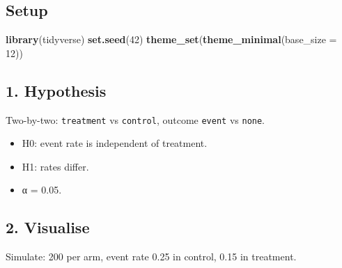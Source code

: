 \documentclass[
]{article}
\newenvironment{Shaded}{\begin{snugshade}}{\end{snugshade}}
\newcommand{\AttributeTok}[1]{\textcolor[rgb]{0.13,0.29,0.53}{#1}}
\newcommand{\DecValTok}[1]{\textcolor[rgb]{0.00,0.00,0.81}{#1}}
\newcommand{\FloatTok}[1]{\textcolor[rgb]{0.00,0.00,0.81}{#1}}
\newcommand{\FunctionTok}[1]{\textcolor[rgb]{0.13,0.29,0.53}{\textbf{#1}}}
\newcommand{\NormalTok}[1]{#1}
\newcommand{\OtherTok}[1]{\textcolor[rgb]{0.56,0.35,0.01}{#1}}
\newcommand{\SpecialCharTok}[1]{\textcolor[rgb]{0.81,0.36,0.00}{\textbf{#1}}}
\newcommand{\StringTok}[1]{\textcolor[rgb]{0.31,0.60,0.02}{#1}}
\providecommand{\tightlist}{%
  \setlength{\itemsep}{0pt}\setlength{\parskip}{0pt}}
\begin{document}
\subsection{Setup}\label{setup}

\begin{Shaded}
\begin{Highlighting}[]
\FunctionTok{library}\NormalTok{(tidyverse)}
\FunctionTok{set.seed}\NormalTok{(}\DecValTok{42}\NormalTok{)}
\FunctionTok{theme\_set}\NormalTok{(}\FunctionTok{theme\_minimal}\NormalTok{(}\AttributeTok{base\_size =} \DecValTok{12}\NormalTok{))}
\end{Highlighting}
\end{Shaded}

\subsection{1. Hypothesis}\label{hypothesis}

Two-by-two: \texttt{treatment} vs \texttt{control}, outcome
\texttt{event} vs \texttt{none}.

\begin{itemize}
\tightlist
\item
  H0: event rate is independent of treatment.
\item
  H1: rates differ.
\item
  α = 0.05.
\end{itemize}

\subsection{2. Visualise}\label{visualise}

Simulate: 200 per arm, event rate 0.25 in control, 0.15 in treatment.

\begin{Shaded}
\end{Shaded}
\end{document}
